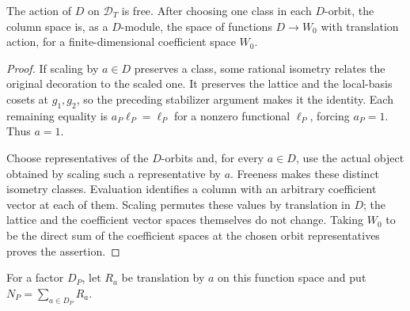 \begin{lemma}\label{cd-diamond-free}
The action of $D$ on $\mathcal D_T$ is free. After choosing one
class in each $D$-orbit, the column space is, as a $D$-module,
the space of functions $D\to W_0$ with translation action,
for a finite-dimensional coefficient space $W_0$.
\end{lemma}
\begin{proof}
If scaling by $a\in D$ preserves a class, some rational
isometry relates the original decoration to the scaled one.
It preserves the lattice and the local-basis cosets at $g_1,g_2$,
so the preceding stabilizer argument makes it the identity.
Each remaining equality is $a_P\ell_P=\ell_P$ for a nonzero
functional $\ell_P$, forcing $a_P=1$. Thus $a=1$.

Choose representatives of the $D$-orbits and, for every $a\in D$,
use the actual object obtained by scaling such a representative
by $a$. Freeness makes these distinct isometry classes. Evaluation
identifies a column with an arbitrary coefficient vector at each
of them. Scaling permutes these values by translation in $D$;
the lattice and the coefficient vector spaces themselves do not
change. Taking $W_0$ to be the direct sum of the coefficient
spaces at the chosen orbit representatives proves the assertion.
\end{proof}

For a factor $D_P$, let $R_a$ be translation by $a$ on this
function space and put $N_P=\sum_{a\in D_P}R_a$.

